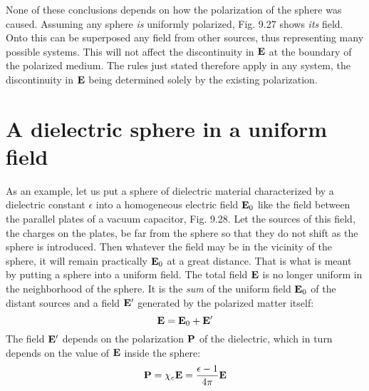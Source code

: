 None of these conclusions depends on how the polarization of
the sphere was caused. Assuming any sphere \emph{is} uniformly polarized,
Fig. 9.27 shows \emph{its} field. Onto this can be superposed any field from
other sources, thus representing many possible systems. This will
not affect the discontinuity in $\mathbf{E}$ at the boundary of the polarized
medium. The rules just stated therefore apply in any system, the
discontinuity in $\mathbf{E}$ being determined solely by the existing polarization.

\section{A dielectric sphere in a uniform field}

As an example, let us put a sphere of dielectric material characterized
by a dielectric constant $\epsilon$ into a homogeneous electric field $\mathbf{E}_0$
like the field between the parallel plates of a vacuum capacitor,
Fig. 9.28. Let the sources of this field, the charges on the plates,
be far from the sphere so that they do not shift as the sphere is 
introduced. Then whatever the field may be in the vicinity of the sphere,
it will remain practically $\mathbf{E}_0$ at a great distance. That is what is meant
by putting a sphere into a uniform field. The total field $\mathbf{E}$ is no
longer uniform in the neighborhood of the sphere. It is the \emph{sum} of
the uniform field $\mathbf{E}_0$ of the distant sources and a field $\mathbf{E}'$ generated
by the polarized matter itself:
\begin{equation}
  \mathbf{E} = \mathbf{E}_0 + \mathbf{E}'
\end{equation}
The field $\mathbf{E}'$ depends on the polarization $\mathbf{P}$ of the dielectric, which in
turn depends on the value of $\mathbf{E}$ inside the sphere:
\begin{equation}
  \mathbf{P} = \chi_e\mathbf{E} = \frac{\epsilon-1}{4\pi}\mathbf{E}
\end{equation}

